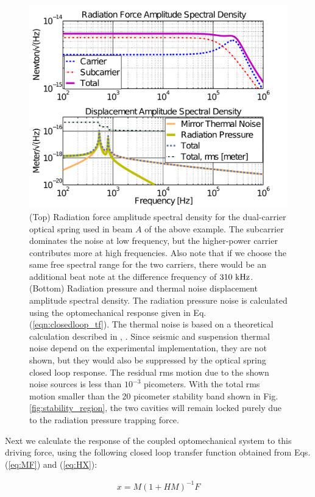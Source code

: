\begin{figure}[htbp]
	\centering
		\includegraphics[width=.7\textwidth]{figures/theory/trap_radPresA_paper4.pdf}
	\caption[Radiation pressure]{(Top) Radiation force amplitude spectral density for the dual-carrier optical spring used in beam $A$ of the above example. The subcarrier dominates the noise at low frequency, but the higher-power carrier contributes more at high frequencies. Also note that if we choose the same free spectral range for the two carriers, there would be an additional beat note at the difference frequency of $310~{\rm kHz}$. (Bottom)  Radiation pressure and thermal noise displacement amplitude spectral density. The radiation pressure noise is calculated using the optomechanical response given in Eq. (\ref{eqn:closedloop_tf}). The thermal noise is based on a theoretical calculation described in \cite{Saulson90}, \cite{Ballmer13}. Since seismic and suspension thermal noise depend on the experimental implementation, they are not shown, but they would also be suppressed by the optical spring closed loop response. The residual rms motion due to the shown noise sources is less than $10^{-3}$ picometers. With the total rms motion smaller than the 20 picometer stability band shown in Fig.\,\ref{fig:stability_region}, the two cavities will remain locked purely due to the radiation pressure trapping force.}
	\label{fig:RFASD}
\end{figure}

Next we calculate the response of the coupled optomechanical system to this driving force, using the following closed loop transfer function obtained from Eqs. (\ref{eq:MF}) and (\ref{eq:HX}):

\begin{align}
\label{eqn:closedloop_tf}
x = {M}({1+HM})^{-1}F
\end{align}

